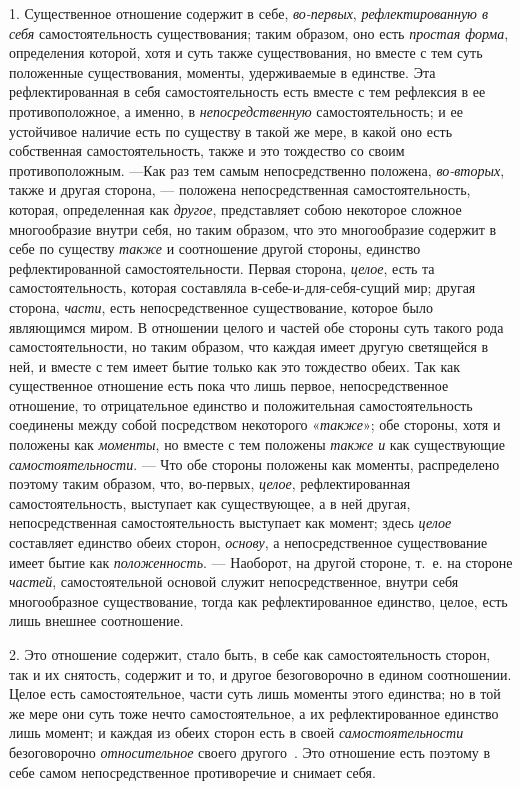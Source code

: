 1. Существенное отношение содержит в себе,
{\em во-первых},
{\em рефлектированную в себя} самостоятельность
существования; таким образом, оно есть {\em простая
форма}, определения которой, хотя и суть также существования, но вместе с
тем суть положенные существования, моменты, удерживаемые в единстве. Эта
рефлектированная в себя самостоятельность есть вместе с тем рефлексия в ее
противоположное, а именно, в {\em непосредственную}
самостоятельность; и ее устойчивое наличие есть по существу в такой же
мере, в какой оно есть собственная самостоятельность, также и это тождество
со своим противоположным. —Как раз тем самым непосредственно положена,
{\em во-вторых}, также и другая сторона, — положена
непосредственная самостоятельность, которая, определенная как
{\em другое}, представляет собою некоторое сложное
многообразие внутри себя, но таким образом, что это многообразие содержит в
себе по существу {\em также} и соотношение другой
стороны, единство рефлектированной самостоятельности. Первая сторона,
{\em целое}, есть та самостоятельность, которая
составляла в-себе-и-для-себя-сущий мир; другая сторона,
{\em части}, есть непосредственное существование,
которое было являющимся миром. В отношении целого и частей обе стороны суть
такого рода самостоятельности, но таким образом, что каждая имеет другую
светящейся в ней, и вместе с тем имеет бытие только как это тождество
обеих. Так как существенное отношение есть пока что лишь первое,
непосредственное отношение, то отрицательное единство и положительная
самостоятельность соединены между собой посредством некоторого
«{\em также}»; обе стороны, хотя и положены как
{\em моменты}, но вместе с тем положены
{\em также и} как существующие
{\em самостоятельности}. — Что обе стороны положены как
моменты, распределено поэтому таким образом, что, во-первых,
{\em целое}, рефлектированная самостоятельность,
выступает как существующее, а в ней другая, непосредственная
самостоятельность выступает как момент; здесь
{\em целое} составляет единство обеих сторон,
{\em основу}, а непосредственное существование имеет
бытие как {\em положенность}. — Наоборот, на другой
стороне, т.~е. на стороне {\em частей}, самостоятельной
основой служит непосредственное, внутри себя многообразное существование,
тогда как рефлектированное единство, целое, есть лишь внешнее соотношение.

2. Это отношение содержит, стало быть, в себе как самостоятельность сторон,
так и их снятость, содержит и то, и другое безоговорочно в едином
соотношении. Целое есть самостоятельное, части суть лишь моменты этого
единства; но в той же мере они суть тоже нечто самостоятельное, а их
рефлектированное единство лишь момент; и каждая из обеих сторон есть в
своей {\em самостоятельности} безоговорочно
{\em относительное} своего
другого~.
Это отношение есть поэтому в себе самом непосредственное противоречие и
снимает себя.

